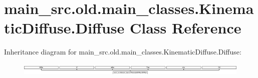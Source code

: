 \hypertarget{classmain__src_8old_1_1main__classes_1_1KinematicDiffuse_1_1Diffuse}{\section{main\-\_\-src.\-old.\-main\-\_\-classes.\-Kinematic\-Diffuse.\-Diffuse Class Reference}
\label{classmain__src_8old_1_1main__classes_1_1KinematicDiffuse_1_1Diffuse}
}
Inheritance diagram for main\-\_\-src.\-old.\-main\-\_\-classes.\-Kinematic\-Diffuse.\-Diffuse\-:\begin{figure}[H]
\begin{center}
\leavevmode
\includegraphics[height=0.596379cm]{classmain__src_8old_1_1main__classes_1_1KinematicDiffuse_1_1Diffuse}
\end{center}
\end{figure}

